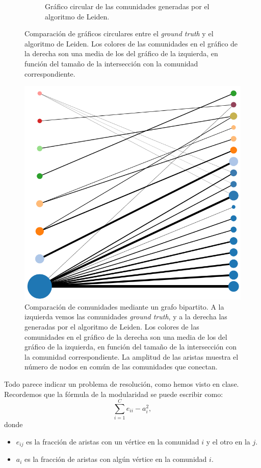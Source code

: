 \begin{figure}[!htb]
\begin{subfigure}{.4\textwidth}
    \caption{Gráfico circular de las comunidades generadas por el algoritmo de Leiden. }
    \label{fig:1-circular-comp-2}
  \end{subfigure}
  \caption{Comparación de gráficos circulares entre el \emph{ground truth} y el
    algoritmo de Leiden. Los colores de las comunidades en el gráfico de la
    derecha son una media de los del gráfico de la izquierda, en función del
    tamaño de la intersección con la comunidad correspondiente.}
  \label{fig:1-circular-comp}
\end{figure}

\begin{figure}[!htb]
  \centering
  \includegraphics[width=.7\linewidth]{img/1_bipartite_comp}
  \caption{Comparación de comunidades mediante un grafo bipartito. A la
    izquierda vemos las comunidades \emph{ground truth}, y a la derecha las
    generadas por el algoritmo de Leiden.  Los colores de las comunidades en el
    gráfico de la derecha son una media de los del gráfico de la izquierda, en
    función del tamaño de la intersección con la comunidad correspondiente. La
    amplitud de las aristas muestra el número de nodos en común de las
    comunidades que conectan.}
  \label{fig:1-bipartite}
\end{figure}



Todo parece indicar un problema de resolución, como hemos visto en clase.
Recordemos que la fórmula de la modularidad se puede escribir como:
$$
\sum_{i=1}^C e_{ii} - a_i^2,
$$
donde
\begin{itemize}
  \item $e_{ij}$ es la fracción de aristas con un vértice en la comunidad $i$ y
    el otro en la $j$.
  \item $a_i$ es la fracción de aristas con algún vértice en la comunidad $i$.
\end{itemize}

